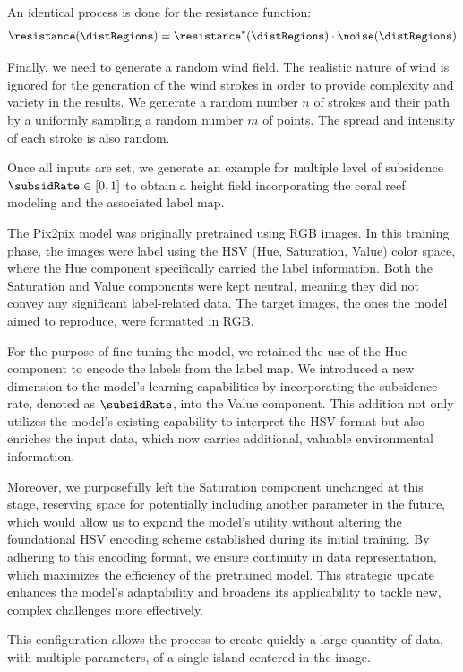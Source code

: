 An identical process is done for the resistance function:
\begin{align}
    \resistance(\distRegions) = \resistance^*(\distRegions) \cdot \noise(\distRegions)
\end{align}

Finally, we need to generate a random wind field. The realistic nature of wind is ignored for the generation of the wind strokes in order to provide complexity and variety in the results. 
We generate a random number $n$ of strokes and their path by a uniformly sampling a random number $m$ of points. The spread and intensity of each stroke is also random.

Once all inputs are set, we generate an example for multiple level of subsidence $\subsidRate \in [0, 1]$ to obtain a height field incorporating the coral reef modeling and the associated label map. 

The Pix2pix model was originally pretrained using RGB images. In this training phase, the images were label using the HSV (Hue, Saturation, Value) color space, where the Hue component specifically carried the label information. Both the Saturation and Value components were kept neutral, meaning they did not convey any significant label-related data. The target images, the ones the model aimed to reproduce, were formatted in RGB.

For the purpose of fine-tuning the model, we retained the use of the Hue component to encode the labels from the label map. We introduced a new dimension to the model's learning capabilities by incorporating the subsidence rate, denoted as $\subsidRate$, into the Value component. This addition not only utilizes the model's existing capability to interpret the HSV format but also enriches the input data, which now carries additional, valuable environmental information.

Moreover, we purposefully left the Saturation component unchanged at this stage, reserving space for potentially including another parameter in the future, which would allow us to expand the model's utility without altering the foundational HSV encoding scheme established during its initial training. By adhering to this encoding format, we ensure continuity in data representation, which maximizes the efficiency of the pretrained model. This strategic update enhances the model's adaptability and broadens its applicability to tackle new, complex challenges more effectively.

This configuration allows the process to create quickly a large quantity of data, with multiple parameters, of a single island centered in the image. 

